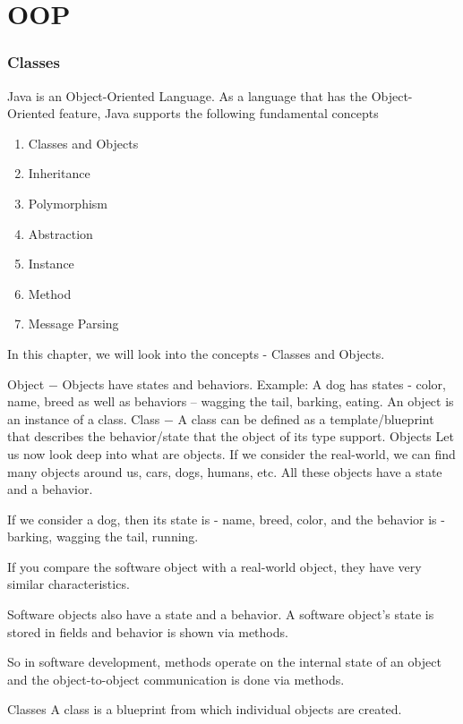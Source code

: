 \chapter{OOP}

\subsection{Classes}

Java is an Object-Oriented Language. As a language that has the Object-Oriented feature, Java supports the following fundamental concepts

\begin{enumerate}
  \item Classes and Objects
  \item Inheritance
  \item Polymorphism
  \item Abstraction
  \item Instance
  \item Method
  \item Message Parsing
\end{enumerate}



In this chapter, we will look into the concepts - Classes and Objects.

Object − Objects have states and behaviors. Example: A dog has states - color, name, breed as well as behaviors – wagging the tail, barking, eating. An object is an instance of a class.
Class − A class can be defined as a template/blueprint that describes the behavior/state that the object of its type support.
Objects
Let us now look deep into what are objects. If we consider the real-world, we can find many objects around us, cars, dogs, humans, etc. All these objects have a state and a behavior.

If we consider a dog, then its state is - name, breed, color, and the behavior is - barking, wagging the tail, running.

If you compare the software object with a real-world object, they have very similar characteristics.

Software objects also have a state and a behavior. A software object's state is stored in fields and behavior is shown via methods.

So in software development, methods operate on the internal state of an object and the object-to-object communication is done via methods.

Classes
A class is a blueprint from which individual objects are created.

